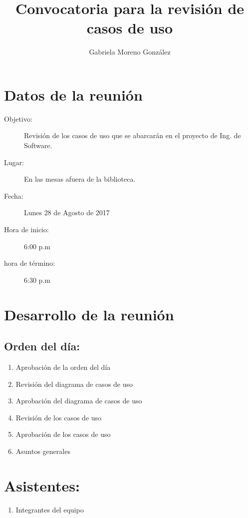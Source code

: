 \documentclass[12pt]{article}
\title{Convocatoria para la revisión de casos de uso}
\author{Gabriela Moreno González}
\begin{document}
\maketitle
\tableofcontents

\section{Datos de la reunión}
\begin{description}
	\item[Objetivo:] Revisión de los casos de uso que se abarcarán en el proyecto de Ing. de Software.
	\item[Lugar:] En las mesas afuera de la biblioteca.
	\item[Fecha:] Lunes 28 de Agosto de 2017
	\item[Hora de inicio:] 6:00 p.m
	\item[hora de término:] 6:30 p.m
\end{description}

\section{Desarrollo de la reunión}

\subsection{Orden del día:}
\begin{enumerate}
 	\item Aprobación de la orden del día
	\item Revisión del diagrama de casos de uso
	\item Aprobación del diagrama de casos de uso
	\item Revisión de los casos de uso
	\item Aprobación de los casos de uso
	\item Asuntos generales
\end{enumerate}

\section{Asistentes:}
\begin{enumerate}
 	 \item  Integrantes del equipo
\end{enumerate}
\end{document}
